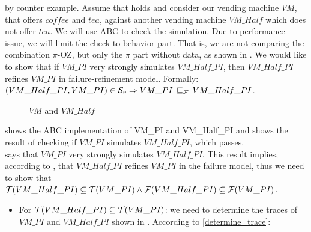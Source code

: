 \begin{prf}
by counter example. Assume that  holds and consider our vending machine $VM$, that offers $coffee$ and $tea$, against another vending machine $VM\_Half$ which does not offer $tea$. We will use ABC to check the simulation. Due to performance issue, we will limit the check to behavior part. That is, we are not comparing the combination $\pi$-OZ, but only the $\pi$ part   without data, as shown in . We would like to show that if $VM\_PI$ very strongly simulates $VM\_Half\_PI$, then $VM\_Half\_PI$ refines $VM\_PI$ in failure-refinement model. Formally: $(VM\_Half\_PI,VM\_PI)\in{}\simuv  \Rightarrow VM\_PI \refiF VM\_Half\_PI$.
\begin{figure}[H]%
\centering
{}%
\qquad
{}%
\caption{$VM$ and $VM\_Half$}
\label{vm_and_vmHalf}
\end{figure}

 shows the ABC implementation of VM\_PI and VM\_Half\_PI and  shows the result of checking if $VM\_PI$ simulates $VM\_Half\_PI$, which passes.\\






 says that $VM\_PI$ very strongly simulates $VM\_Half\_PI$. This result implies, according to , that $VM\_Half\_PI$ refines $VM\_PI$ in the failure model, thus we need to show that $\Traces[VM\_Half\_PI]\subseteq\Traces[VM\_PI] \wedge \Failures[VM\_Half\_PI]\subseteq\Failures[VM\_PI]$.
\begin{itemize}
\item For $\Traces[VM\_Half\_PI]\subseteq\Traces[VM\_PI]$: we need to determine the traces of $VM\_PI$ and $VM\_Half\_PI$  shown in . According to \ref{determine_trace}:


\end{itemize}
\end{prf}
